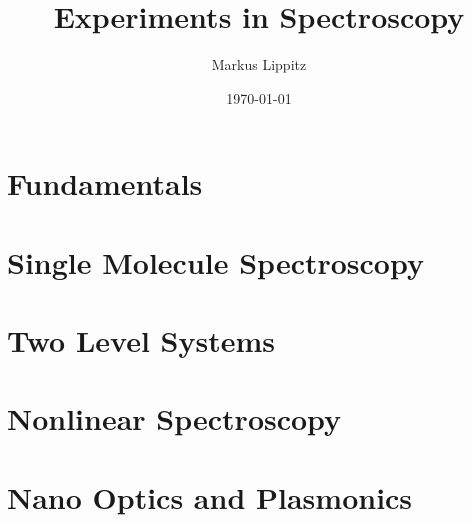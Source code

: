 \documentclass[notoc,nofonts,a4paper,oneside,nobib]{tufte-book}
\begin{document}
\title{Experiments in Spectroscopy}

\author{Markus Lippitz}
\date{\today}


\maketitle



\tableofcontents

\part{Fundamentals}



%







\part{Single Molecule Spectroscopy}










\part{Two Level Systems}





\part{Nonlinear Spectroscopy}






\part{Nano Optics and Plasmonics}





\printbibliography
\end{document}
